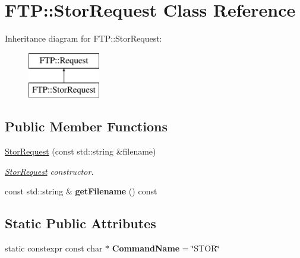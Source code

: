 \hypertarget{class_f_t_p_1_1_stor_request}{\section{F\-T\-P\-:\-:Stor\-Request Class Reference}
\label{class_f_t_p_1_1_stor_request}
}
Inheritance diagram for F\-T\-P\-:\-:Stor\-Request\-:\begin{figure}[H]
\begin{center}
\leavevmode
\includegraphics[height=2.000000cm]{class_f_t_p_1_1_stor_request}
\end{center}
\end{figure}
\subsection*{Public Member Functions}
\begin{DoxyCompactItemize}
\item 
\hyperlink{class_f_t_p_1_1_stor_request_a264af2e26c14e3523e61806e81d2025a}{Stor\-Request} (const std\-::string \&filename)
\begin{DoxyCompactList}\small\item\em \hyperlink{class_f_t_p_1_1_stor_request}{Stor\-Request} constructor. \end{DoxyCompactList}\item 
\hypertarget{class_f_t_p_1_1_stor_request_a21b00910bb4c7624c069054de1dfa362}{const std\-::string \& {\bfseries get\-Filename} () const }\label{class_f_t_p_1_1_stor_request_a21b00910bb4c7624c069054de1dfa362}

\end{DoxyCompactItemize}
\subsection*{Static Public Attributes}
\begin{DoxyCompactItemize}
\item 
\hypertarget{class_f_t_p_1_1_stor_request_af5bd83c0e967012958f8b4ee2af952b6}{static constexpr const char $\ast$ {\bfseries Command\-Name} = \char`\"{}S\-T\-O\-R\char`\"{}}\label{class_f_t_p_1_1_stor_request_af5bd83c0e967012958f8b4ee2af952b6}

\end{DoxyCompactItemize}


